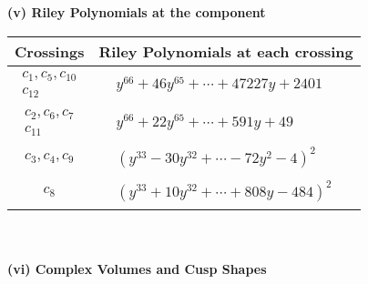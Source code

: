 \documentclass[1p]{elsarticle_modified}
\theoremstyle{definition}
\begin{document}
\newpage\renewcommand{\arraystretch}{1}
\flushleft \textbf{(v) Riley Polynomials at the component}\newline \\
\begin{tabular}{m{50pt}|m{274pt}}
Crossings & \hspace{64pt}Riley Polynomials at each crossing \\
\hline $$\begin{aligned}c_{1},c_{5},c_{10}\\c_{12}\end{aligned}$$&$\begin{aligned}
&y^{66}+46 y^{65}+\cdots+47227 y+2401
\end{aligned}$\\
\hline $$\begin{aligned}c_{2},c_{6},c_{7}\\c_{11}\end{aligned}$$&$\begin{aligned}
&y^{66}+22 y^{65}+\cdots+591 y+49
\end{aligned}$\\
\hline $$\begin{aligned}c_{3},c_{4},c_{9}\end{aligned}$$&$\begin{aligned}
&(y^{33}-30 y^{32}+\cdots-72 y^2-4)^{2}
\end{aligned}$\\
\hline $$\begin{aligned}c_{8}\end{aligned}$$&$\begin{aligned}
&(y^{33}+10 y^{32}+\cdots+808 y-484)^{2}
\end{aligned}$\\
\hline
\end{tabular}\\~\\
\newpage\flushleft \textbf{(vi) Complex Volumes and Cusp Shapes}
\end{document}
